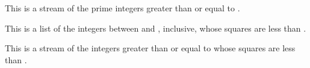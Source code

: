 {\begin{xtc}
\begin{TeXOutput}
\end{TeXOutput}
\end{xtc}
\begin{xtc}
\begin{xtccomment}
This is a stream of the prime integers greater than or equal to .
\end{xtccomment}
\begin{spadsrc}
\end{spadsrc}
\begin{TeXOutput}
\begin{fricasmath}{4}
%
\end{fricasmath}
\end{TeXOutput}
\end{xtc}
\begin{xtc}
\begin{xtccomment}
This is a list of the integers between  and ,
inclusive, whose squares are less than .
\end{xtccomment}
\begin{spadsrc}
\end{spadsrc}
\begin{TeXOutput}
\begin{fricasmath}{5}
%
\end{fricasmath}
\end{TeXOutput}
\end{xtc}
\begin{xtc}
\begin{xtccomment}
This is a stream of the integers greater than or equal to 
whose squares are less than .
\end{xtccomment}
\begin{spadsrc}
\end{spadsrc}
\begin{TeXOutput}
\begin{fricasmath}{6}
%
\end{fricasmath}
\end{TeXOutput}
\end{xtc}

}
